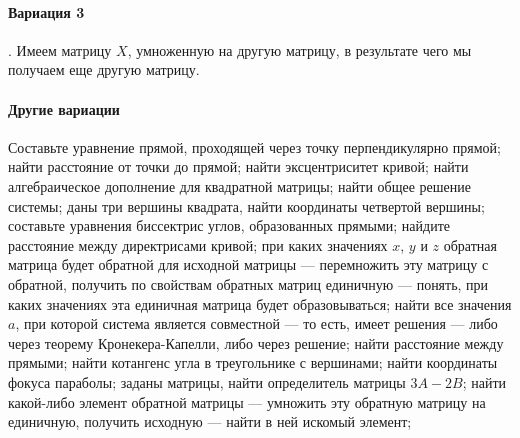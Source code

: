 \documentclass{article}
\begin{document}
\begin{flushleft}
\paragraph{Вариация 3}. Имеем матрицу $X$, умноженную на другую матрицу, в результате чего мы получаем еще другую матрицу.

\paragraph{Другие вариации}

Составьте уравнение прямой, проходящей через точку перпендикулярно прямой; найти расстояние от точки до прямой; найти эксцентриситет кривой; найти алгебраическое дополнение для квадратной матрицы; найти общее решение системы; даны три вершины квадрата, найти координаты четвертой вершины; составьте уравнения биссектрис углов, образованных прямыми; найдите расстояние между директрисами кривой; при каких значениях $x$, $y$ и $z$ обратная матрица будет обратной для исходной матрицы — перемножить эту матрицу с обратной, получить по свойствам обратных матриц единичную — понять, при каких значениях эта единичная матрица будет образовываться; найти все значения $a$, при которой система является совместной — то есть, имеет решения — либо через теорему Кронекера-Капелли, либо через решение; найти расстояние между прямыми; найти котангенс угла в треугольнике с вершинами; найти координаты фокуса параболы; заданы матрицы, найти определитель матрицы $3A - 2B$; найти какой-либо элемент обратной матрицы — умножить эту обратную матрицу на единичную, получить исходную — найти в ней искомый элемент;

\end{flushleft}
\end{document}
